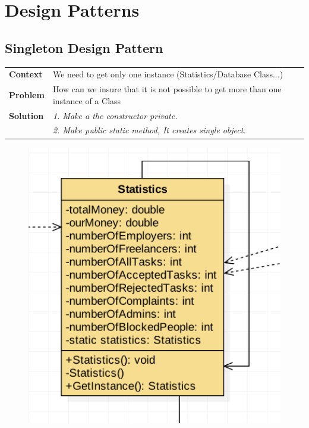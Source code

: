 \documentclass{article}
\begin{document}
\newpage


\section{Design Patterns}

\subsection{Singleton Design Pattern}
    \begin{tabular}{ l | l }
    \toprule
      \rowcolor{LightCyan}
      \textbf{Context}            & We need to get only one instance (Statistics/Database Class...)\\
      \textbf{Problem}            & How can we insure that it is not possible to get more than one instance of a Class\\
      \rowcolor{LightCyan}
      \textbf{Solution}           & \textit{1. Make a the constructor private.}\\
                                  & \textit{2. Make public static method, It creates single object.}\\
    \toprule
    \end{tabular}
\begin{figure}[ht!]
\centering
\includegraphics[width=128mm]{Singleton Design Pattern.jpg}
\end{figure}
\end{document}
